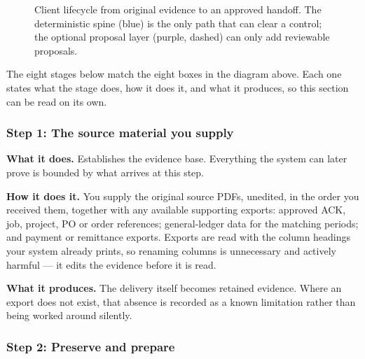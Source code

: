 \documentclass[
]{article}
\begin{document}
\begin{figure}[htbp]
{
}
\caption{Client lifecycle from original evidence to an approved handoff. The deterministic spine (blue) is the only path that can clear a control; the optional proposal layer (purple, dashed) can only add reviewable proposals.}
\end{figure}

The eight stages below match the eight boxes in the diagram above. Each
one states what the stage does, how it does it, and what it produces, so
this section can be read on its own.

\subsubsection{Step 1: The source material you
supply}\label{step-1-the-source-material-you-supply}

\textbf{What it does.} Establishes the evidence base. Everything the
system can later prove is bounded by what arrives at this step.

\textbf{How it does it.} You supply the original source PDFs, unedited,
in the order you received them, together with any available supporting
exports: approved ACK, job, project, PO or order references;
general-ledger data for the matching periods; and payment or remittance
exports. Exports are read with the column headings your system already
prints, so renaming columns is unnecessary and actively harmful --- it
edits the evidence before it is read.

\textbf{What it produces.} The delivery itself becomes retained
evidence. Where an export does not exist, that absence is recorded as a
known limitation rather than being worked around silently.

\subsubsection{Step 2: Preserve and
prepare}\label{step-2-preserve-and-prepare}
\end{document}
